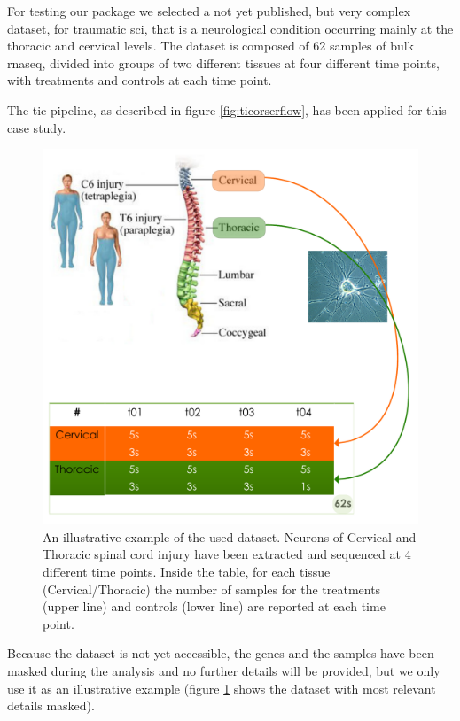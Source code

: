 For testing our package we selected a not yet published, but very complex dataset, for traumatic \gls{sci}, that is a neurological condition occurring mainly at the thoracic and cervical levels.
The dataset is composed of 62 samples of bulk \gls{rnaseq}, divided into groups of two different tissues at four different time points, with treatments and controls at each time point.

The \gls{tic} pipeline, as described in figure \ref{fig:ticorserflow}, has been applied for this case study.

\begin{figure}[H]
\centering
\includegraphics[width=\textwidth, keepaspectratio]{img/ticorser/dataset.pdf}
\caption[ticorser dataset]{An illustrative example of the used dataset. Neurons of Cervical and Thoracic spinal cord injury have been extracted and sequenced at 4 different time points. Inside the table, for each tissue (Cervical/Thoracic) the number of samples for the treatments (upper line) and controls (lower line) are reported at each time point.}
\label{fig:ticorserdataset}

\end{figure}

Because the dataset is not yet accessible, the genes and the samples have been masked during the analysis and no further details will be provided, but we only use it as an illustrative example (figure \ref{fig:ticorserdataset} shows the dataset with most relevant details masked).

